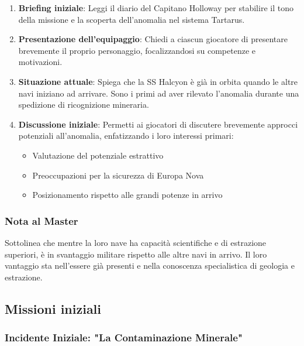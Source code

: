\documentclass[letterpaper,twocolumn,openany,nodeprecatedcode]{dndbook}
\begin{document}
\begin{enumerate}
    \item \textbf{Briefing iniziale}: Leggi il diario del Capitano Holloway per stabilire il tono della missione e la scoperta dell'anomalia nel sistema Tartarus.
    \item \textbf{Presentazione dell'equipaggio}: Chiedi a ciascun giocatore di presentare brevemente il proprio personaggio, focalizzandosi su competenze e motivazioni.
    \item \textbf{Situazione attuale}: Spiega che la SS Halcyon è già in orbita quando le altre navi iniziano ad arrivare. Sono i primi ad aver rilevato l'anomalia durante una spedizione di ricognizione mineraria.
    \item \textbf{Discussione iniziale}: Permetti ai giocatori di discutere brevemente approcci potenziali all'anomalia, enfatizzando i loro interessi primari:
     \begin{itemize}
     \item Valutazione del potenziale estrattivo
     \item Preoccupazioni per la sicurezza di Europa Nova
     \item Posizionamento rispetto alle grandi potenze in arrivo
     \end{itemize}
\end{enumerate}

\subsubsection{Nota al Master}
Sottolinea che mentre la loro nave ha capacità scientifiche e di estrazione superiori, è in svantaggio militare rispetto alle altre navi in arrivo. Il loro vantaggio sta nell'essere già presenti e nella conoscenza specialistica di geologia e estrazione.
\subsection{Missioni iniziali}


\subsubsection{Incidente Iniziale: "La Contaminazione Minerale"}
\end{document}
